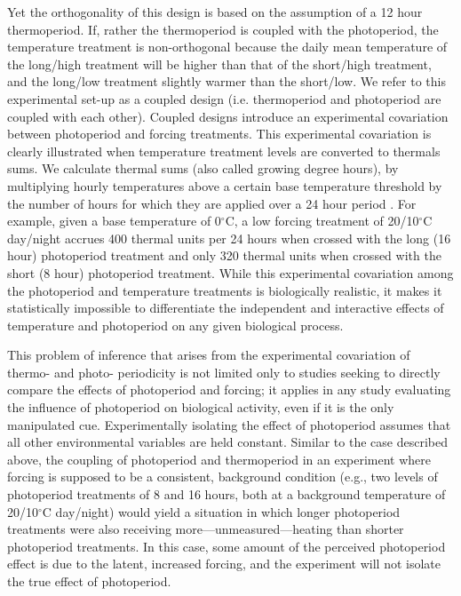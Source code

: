 \documentclass[11pt]{article}
\begin{document}
Yet the orthogonality of this design is based on the assumption of a 12 hour thermoperiod. If, rather the thermoperiod is coupled with the photoperiod, the temperature treatment is non-orthogonal because the daily mean temperature of the long/high treatment will be higher than that of the short/high treatment, and the long/low treatment slightly warmer than the short/low. We refer to this experimental set-up as a coupled design (i.e. thermoperiod and photoperiod are coupled with each other).  %
Coupled designs introduce an experimental covariation between photoperiod and forcing treatments. This experimental covariation is clearly illustrated when temperature treatment levels are converted to thermals sums. We calculate thermal sums (also called growing degree hours), by multiplying hourly temperatures above a certain base temperature threshold by the number of hours for which they are applied over a 24 hour period \citep{Parent:2019ug}. For example, given a base temperature of 0$^{\circ}$C, a low forcing treatment of 20/10$^{\circ}$C day/night accrues 400 thermal units per 24 hours  when crossed with the long (16 hour) photoperiod treatment and only 320 thermal units when crossed with the short (8 hour) photoperiod treatment. While this experimental covariation among the photoperiod and temperature treatments is biologically realistic, it makes it statistically impossible to differentiate the independent and interactive effects of temperature and photoperiod on any given biological process.

This problem of inference that arises from the experimental covariation of thermo- and photo- periodicity is not limited only to studies seeking to directly compare the effects of photoperiod and forcing; it applies in any study evaluating the influence of photoperiod on biological activity, even if it is the only manipulated cue. Experimentally isolating the effect of photoperiod assumes that all other environmental variables are held constant.  Similar to the case described above, %
the coupling of photoperiod and thermoperiod in an experiment where forcing is supposed to be a consistent, background condition (e.g., two levels of photoperiod treatments of 8 and 16 hours, both at a background temperature of 20/10$^{\circ}$C day/night) would yield a situation in which longer photoperiod treatments were also receiving more---unmeasured---heating than shorter photoperiod treatments. In this case, some amount of the perceived photoperiod effect is due to the latent, increased forcing, and the experiment will not isolate the true effect of photoperiod.
\end{document}
